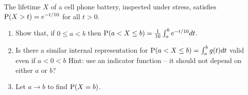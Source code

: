 \documentclass[12pt]{article}
\newcommand{\Prob}{{\rm P}}
\newenvironment{problem}[2][Problem]{\begin{trivlist}
\item[\hskip \labelsep {\bfseries #1}\hskip \labelsep {\bfseries #2.}]}
{\end{trivlist}}
\begin{document}
\begin{problem}{5} The lifetime $X$ of a cell phone battery, inspected
  under stress, satisfies\\ 
  $\Prob(X>t) = e^{-t/10}$ for all $t>0$.
  \begin{enumerate}
    \item Show that, if $0 \le a < b$ then 
    $\Prob(a < X \le b) = \frac{1}{10}\int_a^b e^{-t/10}dt$.
    \item Is there a similar internal representation for 
    $\Prob(a < X \le b) = \int_a^b g(t)dt$ valid even if $a<0<b$
    Hint: use an indicator function -- 
    it should not depend on either $a$ or $b$?
    \item Let $a \to b$ to find $\Prob(X=b)$.
  \end{enumerate}
  
\end{problem}
\end{document}
